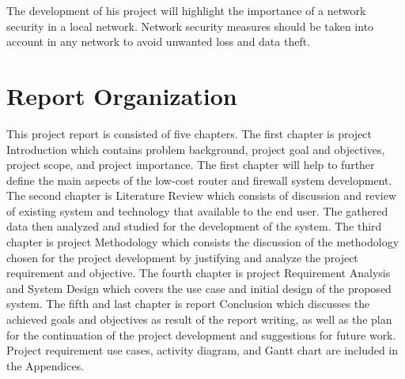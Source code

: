 \documentclass[../index.tex]{subfiles}
\begin{document}
The development of his project will highlight the importance of a network security in a local
network. Network security measures should be taken into account in any network to avoid unwanted
loss and data theft.

\section{Report Organization}

This project report is consisted of five chapters. The first chapter is project Introduction which
contains problem background, project goal and objectives, project scope, and project importance. The
first chapter will help to further define the main aspects of the low-cost router and firewall system
development. The second chapter is Literature Review which consists of discussion and review of
existing system and technology that available to the end user. The gathered data then analyzed and
studied for the development of the system. The third chapter is project Methodology which consists
the discussion of the methodology chosen for the project development by justifying and analyze the
project requirement and objective. The fourth chapter is project Requirement Analysis and System
Design which covers the use case and initial design of the proposed system. The fifth and last
chapter is report Conclusion which discusses the achieved goals and objectives as result of the
report writing, as well as the plan for the continuation of the project development and suggestions
for future work. Project requirement use cases, activity diagram, and Gantt chart are included in
the Appendices.
\end{document}
